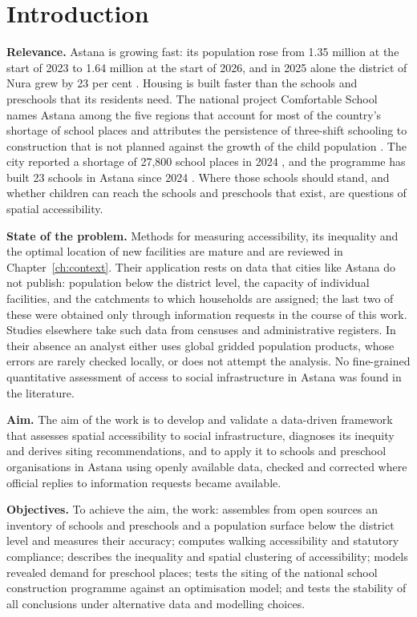 \chapter*{Introduction}

\textbf{Relevance.} Astana is growing fast: its population rose from 1.35 million at the start of 2023 to 1.64 million at the start of 2026, and in 2025 alone the district of Nura grew by 23 per cent \cite{statpop2023, astanapop2026}. Housing is built faster than the schools and preschools that its residents need. The national project Comfortable School names Astana among the five regions that account for most of the country's shortage of school places and attributes the persistence of three-shift schooling to construction that is not planned against the growth of the child population \cite{comfortschool2022}. The city reported a shortage of 27,800 school places in 2024 \cite{zakon2024schools}, and the programme has built 23 schools in Astana since 2024 \cite{skc2023, skc2024, schoolregister2026}. Where those schools should stand, and whether children can reach the schools and preschools that exist, are questions of spatial accessibility.

\textbf{State of the problem.} Methods for measuring accessibility, its inequality and the optimal location of new facilities are mature and are reviewed in Chapter~\ref{ch:context}. Their application rests on data that cities like Astana do not publish: population below the district level, the capacity of individual facilities, and the catchments to which households are assigned; the last two of these were obtained only through information requests in the course of this work. Studies elsewhere take such data from censuses and administrative registers. In their absence an analyst either uses global gridded population products, whose errors are rarely checked locally, or does not attempt the analysis. No fine-grained quantitative assessment of access to social infrastructure in Astana was found in the literature.

\textbf{Aim.} The aim of the work is to develop and validate a data-driven framework that assesses spatial accessibility to social infrastructure, diagnoses its inequity and derives siting recommendations, and to apply it to schools and preschool organisations in Astana using openly available data, checked and corrected where official replies to information requests became available.

\textbf{Objectives.} To achieve the aim, the work: assembles from open sources an inventory of schools and preschools and a population surface below the district level and measures their accuracy; computes walking accessibility and statutory compliance; describes the inequality and spatial clustering of accessibility; models revealed demand for preschool places; tests the siting of the national school construction programme against an optimisation model; and tests the stability of all conclusions under alternative data and modelling choices.

